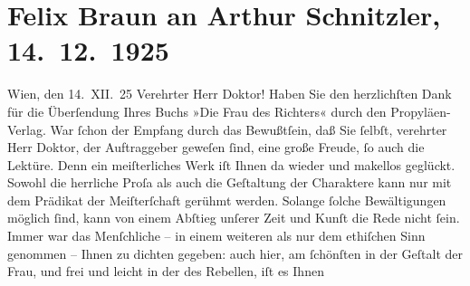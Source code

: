 

         
         \renewcommand{\erwaehntePersonen}{Personen: Felix Braun}
         \renewcommand{\erwaehnteInstitutionen}{Institutionen: Propyläen Verlag}
         \renewcommand{\erwaehnteOrte}{Orte: Wien}
         \renewcommand{\erwaehnteWerke}{Werke: Die Frau des Richters. Novelle}
               \section[Felix Braun an Arthur Schnitzler, 14. 12. 1925]{ Felix Braun an Arthur Schnitzler, 14. 12. 1925}\nopagebreak{}\rehead{ }\begin{ledgroupsized}[t]{13cm}\normalsize\beginnumbering{} \toendnotes[C]{\smallbreak\pagebreak[2]} 
\toendnotes[C]{\smallbreak}\pstart
           \centering{}{\pb}Wien, den 14. XII. 25\pend
           \pstart{}Verehrter Herr Doktor!\pend\pstart
           Haben Sie den herzlichſten Dank für die Überſendung Ihres Buchs »Die Frau des Richters« durch den Propyläen-Verlag. War ſchon der Empfang durch das Bewußtſein, daß Sie
               ſelbſt, verehrter Herr Doktor, der Auftraggeber geweſen ſind, eine große Freude, ſo
               auch die Lektüre. Denn ein meiſterliches Werk iſt Ihnen da wieder und makellos
               geglückt. Sowohl die herrliche Proſa als auch die Geſtaltung der Charaktere kann nur
               mit dem Prädikat der Meiſter{\pb}ſchaft gerühmt werden.
               Solange ſolche Bewältigungen möglich ſind, kann von einem Abſtieg unſerer Zeit und
               Kunſt die Rede nicht ſein.\pend
           \pstart
           Immer war das Menſchliche – in einem weiteren als nur dem ethiſchen Sinn genommen –
               Ihnen zu dichten gegeben: auch hier, am ſchönſten in der Geſtalt der Frau, und frei und leicht in der des Rebellen, iſt es Ihnen

\end{ledgroupsized}
